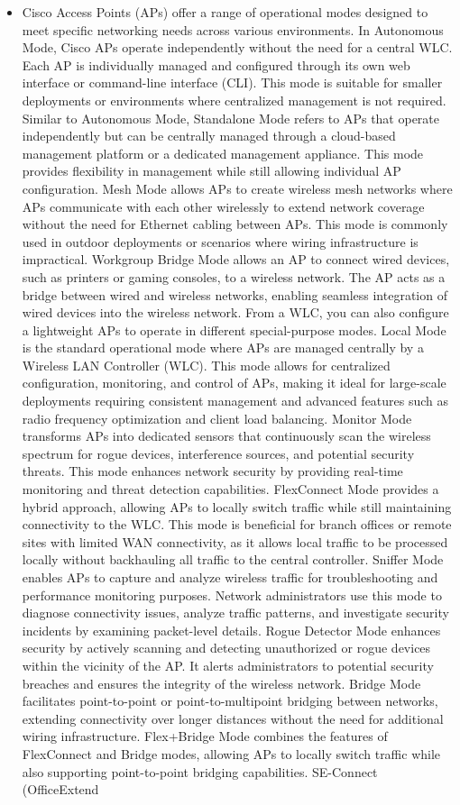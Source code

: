 \documentclass{article}
\begin{document}
\begin{itemize}
	\item[] Cisco Access Points (APs) offer a range of operational modes designed to meet specific networking needs across various environments. In Autonomous Mode, Cisco APs operate independently without the need for a central WLC. Each AP is individually managed and configured through its own web interface or command-line interface (CLI). This mode is suitable for smaller deployments or environments where centralized management is not required. Similar to Autonomous Mode, Standalone Mode refers to APs that operate independently but can be centrally managed through a cloud-based management platform or a dedicated management appliance. This mode provides flexibility in management while still allowing individual AP configuration. Mesh Mode allows APs to create wireless mesh networks where APs communicate with each other wirelessly to extend network coverage without the need for Ethernet cabling between APs. This mode is commonly used in outdoor deployments or scenarios where wiring infrastructure is impractical. Workgroup Bridge Mode allows an AP to connect wired devices, such as printers or gaming consoles, to a wireless network. The AP acts as a bridge between wired and wireless networks, enabling seamless integration of wired devices into the wireless network. From a WLC, you can also configure a lightweight APs to operate in different special-purpose modes. Local Mode is the standard operational mode where APs are managed centrally by a Wireless LAN Controller (WLC). This mode allows for centralized configuration, monitoring, and control of APs, making it ideal for large-scale deployments requiring consistent management and advanced features such as radio frequency optimization and client load balancing. Monitor Mode transforms APs into dedicated sensors that continuously scan the wireless spectrum for rogue devices, interference sources, and potential security threats. This mode enhances network security by providing real-time monitoring and threat detection capabilities. FlexConnect Mode provides a hybrid approach, allowing APs to locally switch traffic while still maintaining connectivity to the WLC. This mode is beneficial for branch offices or remote sites with limited WAN connectivity, as it allows local traffic to be processed locally without backhauling all traffic to the central controller. Sniffer Mode enables APs to capture and analyze wireless traffic for troubleshooting and performance monitoring purposes. Network administrators use this mode to diagnose connectivity issues, analyze traffic patterns, and investigate security incidents by examining packet-level details. Rogue Detector Mode enhances security by actively scanning and detecting unauthorized or rogue devices within the vicinity of the AP. It alerts administrators to potential security breaches and ensures the integrity of the wireless network. Bridge Mode facilitates point-to-point or point-to-multipoint bridging between networks, extending connectivity over longer distances without the need for additional wiring infrastructure. Flex+Bridge Mode combines the features of FlexConnect and Bridge modes, allowing APs to locally switch traffic while also supporting point-to-point bridging capabilities. SE-Connect (OfficeExtend 
\end{itemize}
\end{document}
